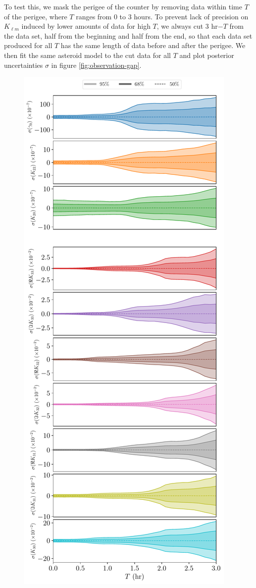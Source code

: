 \documentclass[fleqn,usenatbib]{mnras}
\begin{document}
To test this, we mask the perigee of the counter by removing data within time $T$ of the perigee, where $T$ ranges from 0 to 3 hours. To prevent lack of precision on $K_{\ell m}$ induced by lower amounts of data for high $T$, we always cut 3 hr$-T$ from the data set, half from the beginning and half from the end, so that each data set produced for all $T$ has the same length of data before and after the perigee. We then fit the same asteroid model to the cut data for all $T$ and plot posterior uncertainties $\sigma$ in figure \ref{fig:observation-gap}.

\begin{figure}
  \centering
  \includegraphics[height=0.89\textheight]{figs/observation-gap.pdf}

\end{figure}
\end{document}
